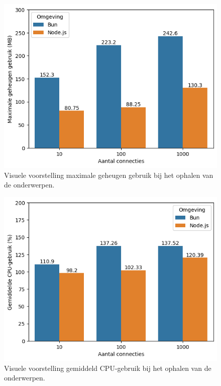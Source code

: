   \begin{figure}[H]
    \centering
    \includegraphics{graphics/GetPostgresRAM.png}
    \caption{\label{fig:getgeheugenpostgres}Visuele voorstelling maximale geheugen gebruik bij het ophalen van de onderwerpen.}
  \end{figure}
  \begin{figure}[H]
    \centering
    \includegraphics{graphics/GetPostgresCpu.png}
    \caption{\label{fig:getcpupostgres}Visuele voorstelling gemiddeld CPU-gebruik bij het ophalen van de onderwerpen.}
  \end{figure}

